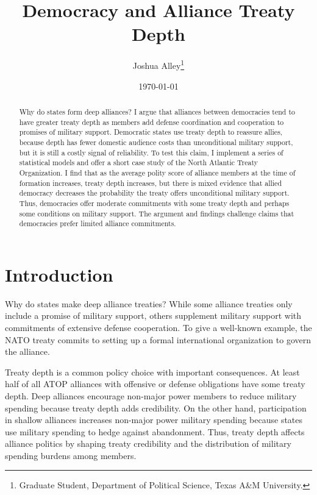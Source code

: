 \documentclass[12pt]{article}
\title{\textbf{Democracy and Alliance Treaty Depth}}
\author{Joshua Alley\footnote{Graduate Student,
Department of Political Science, Texas A\&M University.}}
\date{\today}
\begin{document}
\maketitle 

\doublespace 

\begin{abstract}
Why do states form deep alliances? 
I argue that alliances between democracies tend to have greater treaty depth as members add defense coordination and cooperation to promises of military support. 
Democratic states use treaty depth to reassure allies, because depth has fewer domestic audience costs than unconditional military support, but it is still a costly signal of reliability.
To test this claim, I implement a series of statistical models and offer a short case study of the North Atlantic Treaty Organization.
I find that as the average polity score of alliance members at the time of formation increases, treaty depth increases, but there is mixed evidence that allied democracy decreases the probability the treaty offers unconditional military support. 
Thus, democracies offer moderate commitments with some treaty depth and perhaps some conditions on military support. 
The argument and findings challenge claims that democracies prefer limited alliance commitments. 
\end{abstract}


\newpage 


\section{Introduction}


Why do states make deep alliance treaties? 
While some alliance treaties only include a promise of military support, others supplement military support with commitments of extensive defense cooperation. 
To give a well-known example, the NATO treaty commits to setting up a formal international organization to govern the alliance. 


Treaty depth is a common policy choice with important consequences. 
At least half of all ATOP alliances with offensive or defense obligations have some treaty depth.
Deep alliances encourage non-major power members to reduce military spending because treaty depth adds credibility.  
On the other hand, participation in shallow alliances increases non-major power military spending because states use military spending to hedge against abandonment.
Thus, treaty depth affects alliance politics by shaping treaty credibility and the distribution of military spending burdens among members. 
\end{document}
